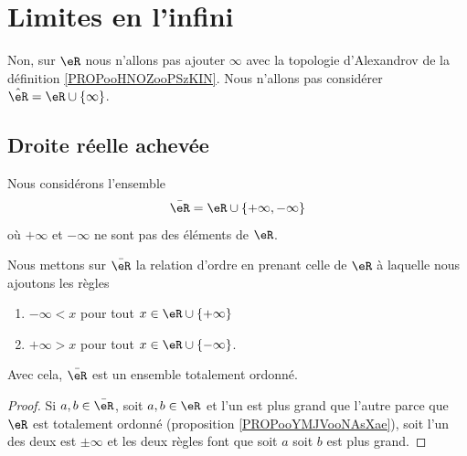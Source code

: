 \section{Limites en l'infini}

Non, sur \( \eR\) nous n'allons pas ajouter \( \infty\) avec la topologie d'Alexandrov de la définition \ref{PROPooHNOZooPSzKIN}. Nous n'allons pas considérer \( \hat \eR=\eR\cup\{ \infty \}\).

\subsection{Droite réelle achevée}


\begin{definition}        \label{DEFooRUyiBSUooALDDOa}
	Nous considérons l'ensemble
	\begin{equation}
		\bar \eR=\eR\cup\{ +\infty,-\infty \}
	\end{equation}
	où \( +\infty\) et \( -\infty\) ne sont pas des éléments de \( \eR\).
\end{definition}

\begin{propositionDef}	\label{PROPooWQBGooAoXKMi}
	Nous mettons sur \( \bar\eR\) la relation d'ordre en prenant celle de \( \eR\) à laquelle nous ajoutons les règles
	\begin{enumerate}
		\item
		      \( -\infty<x\) pour tout \( x\in\eR\cup\{ +\infty \}\)
		\item
		      \( +\infty>x\) pour tout \( x\in \eR\cup\{ -\infty \}\).
	\end{enumerate}

	Avec cela, \( \bar\eR\) est un ensemble totalement ordonné.
\end{propositionDef}

\begin{proof}
	Si \( a,b\in \bar \eR\), soit \( a,b\in \eR\) et l'un est plus grand que l'autre parce que \( \eR\) est totalement ordonné (proposition \ref{PROPooYMJVooNAsXae}), soit l'un des deux est \( \pm\infty\) et les deux règles font que soit \( a\) soit \( b\) est plus grand.
\end{proof}

